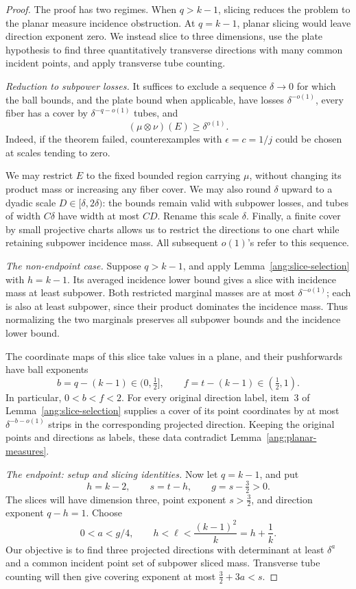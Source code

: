 \begin{proof}
The proof has two regimes. When \(q>k-1\), slicing reduces the problem to the planar measure incidence obstruction. At \(q=k-1\), planar slicing would leave direction exponent zero. We instead slice to three dimensions, use the plate hypothesis to find three quantitatively transverse directions with many common incident points, and apply transverse tube counting.

\emph{Reduction to subpower losses.}
It suffices to exclude a sequence \(\delta\to0\) for which the ball bounds, and the plate bound when applicable, have losses \(\delta^{-o(1)}\), every fiber has a cover by \(\delta^{-q-o(1)}\) tubes, and
\[
(\mu\otimes\nu)(E)\ge \delta^{o(1)}.
\]
Indeed, if the theorem failed, counterexamples with \(\epsilon=c=1/j\) could be chosen at scales tending to zero.

We may restrict \(E\) to the fixed bounded region carrying \(\mu\), without changing its product mass or increasing any fiber cover. We may also round \(\delta\) upward to a dyadic scale \(D\in[\delta,2\delta)\): the bounds remain valid with subpower losses, and tubes of width \(C\delta\) have width at most \(CD\). Rename this scale \(\delta\). Finally, a finite cover by small projective charts allows us to restrict the directions to one chart while retaining subpower incidence mass. All subsequent \(o(1)\)'s refer to this sequence.

\emph{The non-endpoint case.}
Suppose \(q>k-1\), and apply Lemma~\ref{ang:slice-selection} with \(h=k-1\). Its averaged incidence lower bound gives a slice with incidence mass at least subpower. Both restricted marginal masses are at most \(\delta^{-o(1)}\); each is also at least subpower, since their product dominates the incidence mass. Thus normalizing the two marginals preserves all subpower bounds and the incidence lower bound.

The coordinate maps of this slice take values in a plane, and their pushforwards have ball exponents
\[
b=q-(k-1)\in(0,\tfrac12],
\qquad
f=t-(k-1)\in(\tfrac12,1).
\]
In particular, \(0<b<f<2\). For every original direction label, item~3 of Lemma~\ref{ang:slice-selection} supplies a cover of its point coordinates by at most \(\delta^{-b-o(1)}\) strips in the corresponding projected direction. Keeping the original points and directions as labels, these data contradict Lemma~\ref{ang:planar-measures}.

\emph{The endpoint: setup and slicing identities.}
Now let \(q=k-1\), and put
\[
h=k-2,\qquad s=t-h,\qquad g=s-\tfrac32>0.
\]
The slices will have dimension three, point exponent \(s>\tfrac32\), and direction exponent \(q-h=1\). Choose
\[
0<a<g/4,
\qquad
h<\ell<\frac{(k-1)^2}{k}=h+\frac1k.
\]
Our objective is to find three projected directions with determinant at least \(\delta^a\) and a common incident point set of subpower sliced mass. Transverse tube counting will then give covering exponent at most \(\tfrac32+3a<s\).


\end{proof}
